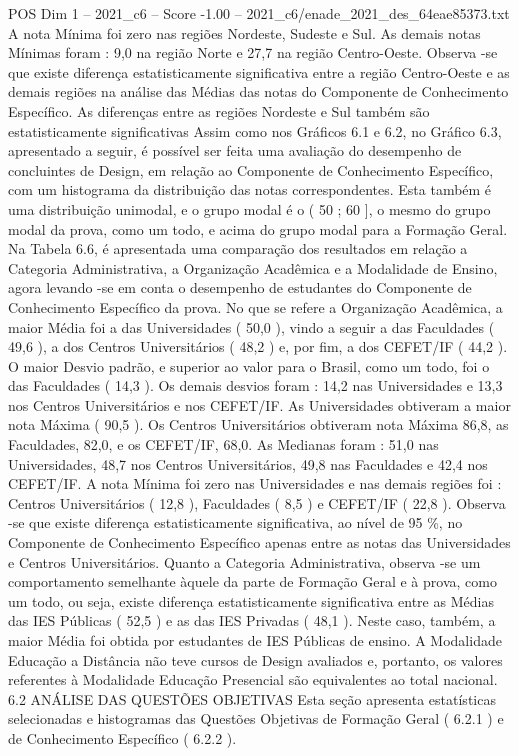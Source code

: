 \begin{textsample}{POS Dim 1 – 2021\_c6 – Score -1.00 – 2021\_c6/enade\_2021\_des\_64eae85373.txt}
A nota Mínima foi zero nas regiões Nordeste, Sudeste e Sul.
As demais notas Mínimas foram : 9,0 na região Norte e 27,7 na região Centro-Oeste.
Observa -se que existe diferença estatisticamente significativa entre a região Centro-Oeste e as demais regiões na análise das Médias das notas do Componente de Conhecimento Específico.
As diferenças entre as regiões Nordeste e Sul também são estatisticamente significativas Assim como nos Gráficos 6.1 e 6.2, no Gráfico 6.3, apresentado a seguir, é possível ser feita uma avaliação do desempenho de concluintes de Design, em relação ao Componente de Conhecimento Específico, com um histograma da distribuição das notas correspondentes.
Esta também é uma distribuição unimodal, e o grupo modal é o ( 50 ; 60 ], o mesmo do grupo modal da prova, como um todo, e acima do grupo modal para a Formação Geral.
Na Tabela 6.6, é apresentada uma comparação dos resultados em relação a Categoria Administrativa, a Organização Acadêmica e a Modalidade de Ensino, agora levando -se em conta o desempenho de estudantes do Componente de Conhecimento Específico da prova.
No que se refere a Organização Acadêmica, a maior Média foi a das Universidades ( 50,0 ), vindo a seguir a das Faculdades ( 49,6 ), a dos Centros Universitários ( 48,2 ) e, por fim, a dos CEFET/IF ( 44,2 ).
O maior Desvio padrão, e superior ao valor para o Brasil, como um todo, foi o das Faculdades ( 14,3 ).
Os demais desvios foram : 14,2 nas Universidades e 13,3 nos Centros Universitários e nos CEFET/IF.
As Universidades obtiveram a maior nota Máxima ( 90,5 ).
Os Centros Universitários obtiveram nota Máxima 86,8, as Faculdades, 82,0, e os CEFET/IF, 68,0.
As Medianas foram : 51,0 nas Universidades, 48,7 nos Centros Universitários, 49,8 nas Faculdades e 42,4 nos CEFET/IF.
A nota Mínima foi zero nas Universidades e nas demais regiões foi : Centros Universitários ( 12,8 ), Faculdades ( 8,5 ) e CEFET/IF ( 22,8 ).
Observa -se que existe diferença estatisticamente significativa, ao nível de 95 \%, no Componente de Conhecimento Específico apenas entre as notas das Universidades e Centros Universitários.
Quanto a Categoria Administrativa, observa -se um comportamento semelhante àquele da parte de Formação Geral e à prova, como um todo, ou seja, existe diferença estatisticamente significativa entre as Médias das IES Públicas ( 52,5 ) e as das IES Privadas ( 48,1 ).
Neste caso, também, a maior Média foi obtida por estudantes de IES Públicas de ensino.
A Modalidade Educação a Distância não teve cursos de Design avaliados e, portanto, os valores referentes à Modalidade Educação Presencial são equivalentes ao total nacional. 6.2 ANÁLISE DAS QUESTÕES OBJETIVAS Esta seção apresenta estatísticas selecionadas e histogramas das Questões Objetivas de Formação Geral ( 6.2.1 ) e de Conhecimento Específico ( 6.2.2 ).

\end{textsample}
